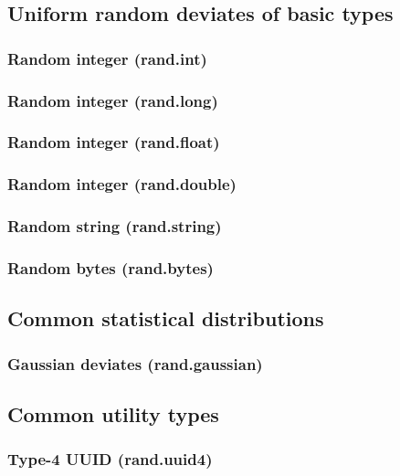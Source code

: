 \documentclass{article}
\theoremstyle{definition}
\begin{document}
\subsection{Uniform random deviates of basic types}

\subsubsection{Random integer (rand.int)}

\subsubsection{Random integer (rand.long)}

\subsubsection{Random integer (rand.float)}

\subsubsection{Random integer (rand.double)}

\subsubsection{Random string (rand.string)}

\subsubsection{Random bytes (rand.bytes)}

\subsection{Common statistical distributions}

\subsubsection{Gaussian deviates (rand.gaussian)}

\subsection{Common utility types}

\subsubsection{Type-4 UUID (rand.uuid4)}
\end{document}
